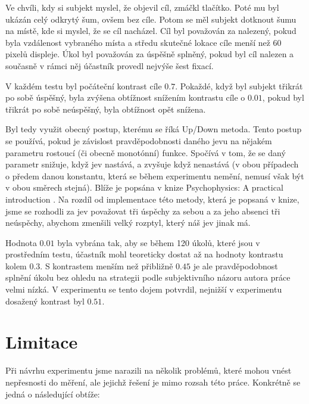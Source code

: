 Ve chvíli, kdy si subjekt myslel, že objevil cíl, zmáčkl tlačítko. Poté mu byl ukázán celý odkrytý šum, ovšem
bez cíle. Potom se měl subjekt dotknout šumu na místě, kde si myslel, že se cíl
nacházel. Cíl byl považován za nalezený, pokud byla vzdálenost vybraného místa
a středu skutečné lokace cíle menší než 60 pixelů displeje. Úkol byl považován za úspěšně splněný, pokud byl cíl nalezen a současně v rámci něj účastník provedl nejvýše šest fixací. 

V každém testu byl počáteční kontrast cíle $0.7$. Pokaždé, když byl subjekt třikrát po sobě úspěšný,
byla zvýšena obtížnost snížením kontrastu cíle o $0.01$, pokud byl
třikrát po sobě neúspěšný, byla obtížnost opět snížena. 

Byl tedy využit obecný postup, kterému se říká Up/Down metoda. Tento postup se používá,
pokud je závislost pravděpodobnosti daného jevu na nějakém parametru rostoucí
(či obecně monotónní) funkce. Spočívá v tom, že se daný parametr snižuje, když
jev nastává, a zvyšuje když nenastává (v obou případech o předem danou
konstantu, která se během experimentu nemění, nemusí však být v obou směrech
stejná). Blíže je popsána v knize Psychophysics: A practical introduction \citep{psychophysics}.
Na rozdíl od implementace této metody, která je popsaná v knize, jsme se
rozhodli za jev považovat tři úspěchy za sebou a za jeho absenci tři neúspěchy,
abychom zmenšili velký rozptyl, který náš jev jinak má.

Hodnota $0.01$ byla vybrána tak, aby se během 120 úkolů, které jsou v
prostředním testu, účastník mohl teoreticky dostat až na hodnoty kontrastu
kolem $0.3$. S kontrastem menším než přibližně $0.45$ je ale pravděpodobnost
splnění úkolu bez ohledu na strategii podle subjektivního názoru autora práce
velmi nízká. V experimentu se tento dojem potvrdil, nejnižší v experimentu
dosažený kontrast byl $0.51$.



\section{Limitace}

Při návrhu experimentu jsme narazili na několik problémů, které mohou vnést
nepřesnosti do měření, ale jejichž řešení je mimo rozsah této práce. Konkrétně
se jedná o následující obtíže:

